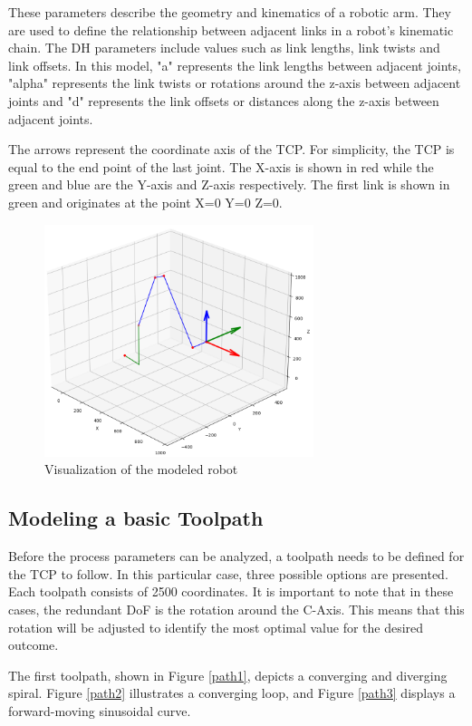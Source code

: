 These parameters describe the geometry and kinematics of a robotic arm. They are used to define the relationship between adjacent links in a robot's kinematic chain. The DH parameters include values such as link lengths, link twists and link offsets. In this model, "a" represents the link lengths between adjacent joints, "alpha" represents the link twists or rotations around the z-axis between adjacent joints and "d" represents the link offsets or distances along the z-axis between adjacent joints. 

The arrows represent the coordinate axis of the TCP. For simplicity, the TCP is equal to the end point of the last joint. The X-axis is shown in red while the green and blue are the Y-axis and Z-axis respectively. The first link is shown in green and originates at the point X=0 Y=0 Z=0.

 \begin{figure}[H]
	\centerline{\includegraphics[width=0.7\textwidth]{figures/robotprog.png}}
	\caption{Visualization of the modeled robot}
	\label{robotprog}
\end{figure}

\subsection{Modeling a basic Toolpath}
Before the process parameters can be analyzed, a toolpath needs to be defined for the TCP to follow. In this particular case, three possible options are presented. Each toolpath consists of 2500 coordinates. It is important to note that in these cases, the redundant DoF is the rotation around the C-Axis. This means that  this rotation will be adjusted to identify the most optimal value for the desired outcome.


The first toolpath, shown in Figure \ref{path1}, depicts a converging and diverging spiral. Figure \ref{path2} illustrates a converging loop, and Figure \ref{path3} displays a forward-moving sinusoidal curve. 

